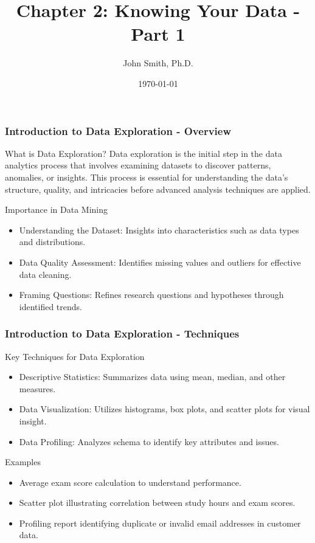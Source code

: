 \documentclass[aspectratio=169]{beamer}
\title[Knowing Your Data]{Chapter 2: Knowing Your Data - Part 1}
\author[J. Smith]{John Smith, Ph.D.}
\institute[University Name]{
  Department of Computer Science\\
  University Name\\
  \vspace{0.3cm}
  Email: email@university.edu\\
  Website: www.university.edu
}
\date{\today}
\begin{document}
\frame{\titlepage}

\begin{frame}[fragile]
    \frametitle{Introduction to Data Exploration - Overview}
    \begin{block}{What is Data Exploration?}
        Data exploration is the initial step in the data analytics process that involves examining datasets to discover patterns, anomalies, or insights. 
        This process is essential for understanding the data's structure, quality, and intricacies before advanced analysis techniques are applied.
    \end{block}
    
    \begin{block}{Importance in Data Mining}
        \begin{itemize}
            \item Understanding the Dataset: Insights into characteristics such as data types and distributions.
            \item Data Quality Assessment: Identifies missing values and outliers for effective data cleaning.
            \item Framing Questions: Refines research questions and hypotheses through identified trends.
        \end{itemize}
    \end{block}
\end{frame}

\begin{frame}[fragile]
    \frametitle{Introduction to Data Exploration - Techniques}
    \begin{block}{Key Techniques for Data Exploration}
        \begin{itemize}
            \item Descriptive Statistics: Summarizes data using mean, median, and other measures.
            \item Data Visualization: Utilizes histograms, box plots, and scatter plots for visual insight.
            \item Data Profiling: Analyzes schema to identify key attributes and issues.
        \end{itemize}
    \end{block}
    
    \begin{exampleblock}{Examples}
        \begin{itemize}
            \item Average exam score calculation to understand performance.
            \item Scatter plot illustrating correlation between study hours and exam scores.
            \item Profiling report identifying duplicate or invalid email addresses in customer data.
        \end{itemize}
    \end{exampleblock}
\end{frame}
\end{document}
